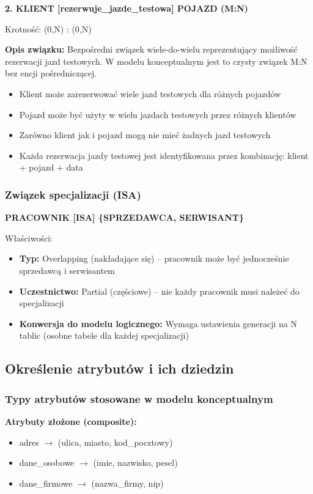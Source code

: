 \documentclass[a4paper,titleauthor]{mwart}
\begin{document}
	\textbf{2. KLIENT [rezerwuje\_jazde\_testowa] POJAZD (M:N)}

	Krotność: (0,N) : (0,N)

	\textbf{Opis związku:} Bezpośredni związek wiele-do-wielu reprezentujący możliwość 
	rezerwacji jazd testowych. W modelu konceptualnym jest to czysty związek M:N bez 
	encji pośredniczącej.

	\begin{itemize}
		\item Klient może zarezerwować wiele jazd testowych dla różnych pojazdów
		\item Pojazd może być użyty w wielu jazdach testowych przez różnych klientów
		\item Zarówno klient jak i pojazd mogą nie mieć żadnych jazd testowych
		\item Każda rezerwacja jazdy testowej jest identyfikowana przez kombinację: klient + pojazd + data
	\end{itemize}
	
	\subsubsection{Związek specjalizacji (ISA)}
	
	\textbf{PRACOWNIK [ISA] \{SPRZEDAWCA, SERWISANT\}}
	
	Właściwości:
	\begin{itemize}
		\item \textbf{Typ:} Overlapping (nakładające się) -- pracownik może być jednocześnie sprzedawcą i serwisantem
		\item \textbf{Uczestnictwo:} Partial (częściowe) -- nie każdy pracownik musi należeć do specjalizacji
		\item \textbf{Konwersja do modelu logicznego:} Wymaga ustawienia generacji na N tablic (osobne tabele dla każdej specjalizacji)
	\end{itemize}
	
	\subsection{Określenie atrybutów i ich dziedzin}
	
	\subsubsection{Typy atrybutów stosowane w modelu konceptualnym}
	
	\textbf{Atrybuty złożone (composite):}
	\begin{itemize}
		\item adres $\rightarrow$ (ulica, miasto, kod\_pocztowy)
		\item dane\_osobowe $\rightarrow$ (imie, nazwisko, pesel)
		\item dane\_firmowe $\rightarrow$ (nazwa\_firmy, nip)
	\end{itemize}
	
\end{document}
